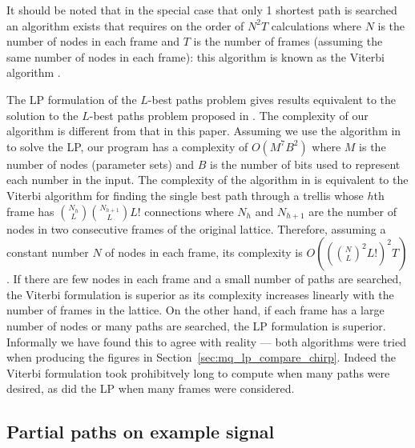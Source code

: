 It should be noted that in the special case that only 1 shortest path is
searched an algorithm exists that requires on the order of $N^{2}T$ calculations
\cite{rabiner1989tutorial} where $N$ is the number of nodes in each frame and
$T$ is the number of frames (assuming the same number of nodes in each frame):
this algorithm is known as the Viterbi algorithm \cite{forney1973viterbi}.

The LP formulation of the $L$-best paths problem gives results equivalent to the
solution to the $L$-best paths problem proposed in \cite{wolf1989finding}. The
complexity of our algorithm is different from that in this paper.  Assuming we
use the algorithm in \cite{karmarkar1984new} to solve the LP, our program has a
complexity of $O(M^{7}B^{2})$ where $M$ is the number of nodes (parameter sets)
and $B$ is the number of bits used to represent each number in the input. The
complexity of the algorithm in \cite{wolf1989finding} is equivalent to the
Viterbi algorithm for finding the single best path through a trellis whose $h$th
frame has $\binom{N_{h}}{L}\binom{N_{h+1}}{L}L!$ connections where $N_{h}$ and
$N_{h+1}$ are the number of nodes in two consecutive frames of the original
lattice. Therefore, assuming a constant number $N$ of nodes in each frame, its
complexity is $O((\binom{N}{L}^{2}L!)^{2}T)$. If there are few nodes in each
frame and a small number of paths are searched, the Viterbi formulation is
superior as its complexity increases linearly with the number of frames in the
lattice. On the other hand, if each frame has a large number of nodes or many
paths are searched, the LP formulation is superior.  Informally we have found
this to agree with reality --- both algorithms were tried when producing the
figures in Section~\ref{sec:mq_lp_compare_chirp}.  Indeed the Viterbi
formulation took prohibitvely long to compute when many paths were desired, as
did the LP when many frames were considered.

\subsection{Partial paths on example signal\label{sec:mq_lp_compare_chirp}}

